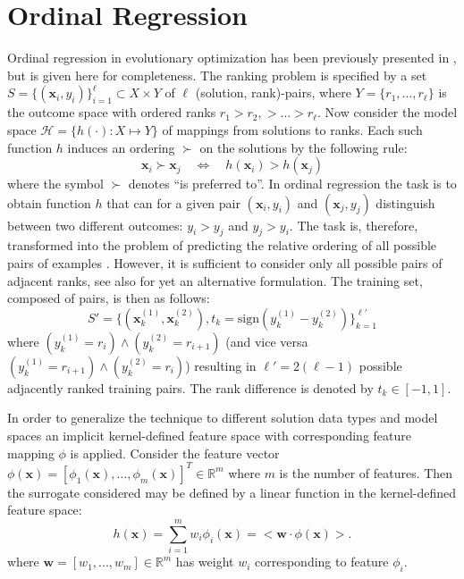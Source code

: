 \documentclass[10pt, conference]{IEEEtran} %
\newcommand{\inner}[2]{\big<{#1}\cdot{#2}\big>}
\renewcommand{\vec}[1]{\mathbf{#1}}
\begin{document}
\section{Ordinal Regression}\label{sec:OR}
Ordinal regression in evolutionary optimization has been previously presented in \cite{Ru06:PPSN}, but is given here for completeness. The ranking problem is specified by a set $S = \{(\vec{x}_i,y_i)\}_{i=1}^\ell \subset X \times Y$ of $\ell$ (solution, rank)-pairs, where $Y=\{r_1,\ldots,r_\ell\}$ is the outcome space with ordered ranks $r_1> r_2,> \ldots > r_\ell$.   Now consider the model space $\mathcal{H} = \{h(\cdot) : X \mapsto Y\}$ of mappings from solutions to ranks. Each such function $h$ induces an ordering $\succ$ on the solutions  by the following rule:
\begin{equation}
\vec{x}_i \succ \vec{x}_j \quad \Leftrightarrow \quad h(\vec{x}_i) > h(\vec{x}_j)
\end{equation}
where the symbol $\succ$ denotes ``is preferred to''.  In ordinal regression the task is to obtain function $h$ that can for a given pair $(\vec{x}_i,y_i)$ and $(\vec{x}_j,y_j)$ distinguish between two different outcomes: $y_i > y_j$ and $y_j > y_i$. The task is, therefore, transformed into the problem of predicting the relative ordering of all possible pairs of examples \cite{Herbrich00,joachims02}.  However, it is sufficient to consider only all possible pairs of adjacent ranks, see also \cite{shawe-taylor04:book} for yet an alternative formulation.  The training set, composed of pairs, is then as follows:
\begin{equation}
S' = \big\{(\vec{x}_k^{(1)}, \vec{x}_k^{(2)}),t_k=\text{sign}(y_k^{(1)} - y_k^{(2)})\big\}_{k=1}^{\ell'}  
\end{equation}
where $(y_k^{(1)} = r_i) \wedge (y_k^{(2)} = r_{i+1})$ (and vice versa $(y_k^{(1)} = r_{i+1}) \wedge (y_k^{(2)} = r_{i})$) resulting in $\ell'=2(\ell-1)$ possible adjacently ranked training pairs. The rank difference is denoted by $t_k\in[-1,1]$.

In order to generalize the technique to different solution data types and model spaces an implicit kernel-defined feature space with corresponding feature mapping $\phi$ is applied. Consider the feature vector $\phi(\vec{x})=[\phi_1(\vec{x}),\ldots,\phi_m(\vec{x})]^T\in \mathbb{R}^m$ where $m$ is the number of features. Then the surrogate considered may be defined by a linear function in the kernel-defined feature space:
\begin{equation}
  h(\vec{x}) = \sum_{i=1}^m w_i\phi_i(\vec{x}) = \inner{\vec{w}}{\phi(\vec{x})}.
\end{equation}
where $\vec{w}=[w_1,...,w_m]\in\mathbb{R}^m$ has weight $w_i$ corresponding to feature $\phi_i$.
\end{document}

